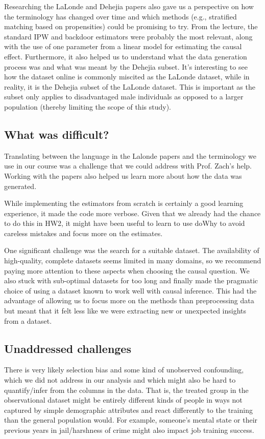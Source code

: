 \documentclass[12pt]{article}
\begin{document}
Researching the LaLonde and Dehejia papers also gave us a perspective on how the terminology has changed over time and which methods (e.g., stratified matching based on propensities) could be promising to try.
From the lecture, the standard IPW and backdoor estimators were probably the most relevant, along with the use of one parameter from a linear model for estimating the causal effect. Furthermore, it also helped us to understand what the data generation process was and what was meant by the Dehejia subset. It's interesting to see how the dataset online is commonly miscited as the LaLonde dataset, while in reality, it is the Dehejia subset of the LaLonde dataset. This is important as the subset only applies to disadvantaged male individuals as opposed to a larger population (thereby limiting the scope of this study).

\subsection*{What was difficult?}

Translating between the language in the Lalonde papers and the terminology we use in our course was a challenge that we could address with Prof. Zach's help. Working with the papers also helped us learn more about how the data was generated. 

While implementing the estimators from scratch is certainly a good learning experience, it made the code more verbose. Given that we already had the chance to do this in HW2, it might have been useful to learn to use doWhy to avoid careless mistakes and focus more on the estimates.

One significant challenge was the search for a suitable dataset. The availability of high-quality, complete datasets seems limited in many domains, so we recommend paying more attention to these aspects when choosing the causal question. We also stuck with sub-optimal datasets for too long and finally made the pragmatic choice of using a dataset known to work well with causal inference. This had the advantage of allowing us to focus more on the methods than preprocessing data but meant that it felt less like we were extracting new or unexpected insights from a dataset.


\subsection*{Unaddressed challenges}

There is very likely selection bias and some kind of unobserved confounding, which we did not address in our analysis and which might also be hard to quantify/infer from the columns in the data. That is, the treated group in the observational dataset might be entirely different kinds of people in ways not captured by simple demographic attributes and react differently to the training than the general population would. For example, someone's mental state or their previous years in jail/harshness of crime might also impact job training success. 
\end{document}
